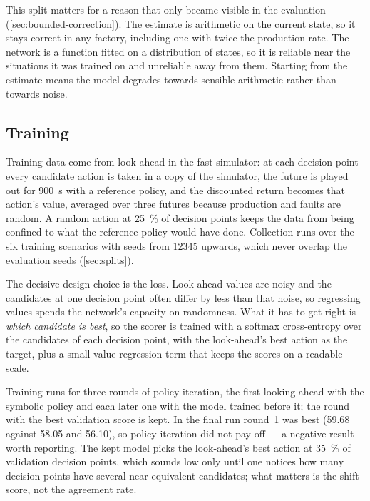 This split matters for a reason that only became visible in the evaluation
(\cref{sec:bounded-correction}). The estimate is arithmetic on the current state, so it stays
correct in any factory, including one with twice the production rate. The network is a function
fitted on a distribution of states, so it is reliable near the situations it was trained on and
unreliable away from them. Starting from the estimate means the model degrades towards sensible
arithmetic rather than towards noise.

\subsection{Training}
\label{sec:ns-training}

Training data come from look-ahead in the fast simulator: at each decision point every candidate
action is taken in a copy of the simulator, the future is played out for \SI{900}{\second} with a
reference policy, and the discounted return becomes that action's value, averaged over three
futures because production and faults are random. A random action at \SI{25}{\percent} of decision
points keeps the data from being confined to what the reference policy would have done. Collection
runs over the six training scenarios with seeds from \num{12345} upwards, which never overlap the
evaluation seeds (\cref{sec:splits}).

The decisive design choice is the loss. Look-ahead values are noisy and the candidates at one
decision point often differ by less than that noise, so regressing values spends the network's
capacity on randomness. What it has to get right is \emph{which candidate is best}, so the scorer is
trained with a softmax cross-entropy over the candidates of each decision point, with the
look-ahead's best action as the target, plus a small value-regression term that keeps the scores on
a readable scale.

Training runs for three rounds of policy iteration, the first looking ahead with the symbolic
policy and each later one with the model trained before it; the round with the best validation
score is kept. In the final run round~1 was best (\num{59.68} against \num{58.05} and \num{56.10}),
so policy iteration did not pay off --- a negative result worth reporting. The kept model picks the
look-ahead's best action at \SI{35}{\percent} of validation decision points, which sounds low only
until one notices how many decision points have several near-equivalent candidates; what matters is
the shift score, not the agreement rate.


